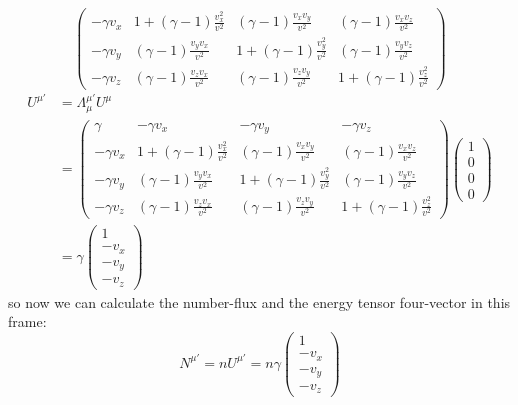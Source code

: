 \documentclass[11pt, a4paper]{report}
\begin{document}
\begin{itemize}
\begin{equation}
\begin{pmatrix}
        -\gamma v_x & 1+(\gamma-1)\frac{v_x^2}{v^2} & (\gamma-1)\frac{v_x v_y}{v^2} & (\gamma-1)\frac{v_x v_z}{v^2} \\
        -\gamma v_y & (\gamma-1)\frac{v_y v_x}{v^2} & 1+(\gamma-1)\frac{v_y^2}{v^2} & (\gamma-1)\frac{v_y v_z}{v^2} \\
        -\gamma v_z & (\gamma-1)\frac{v_z v_x}{v^2} & (\gamma-1)\frac{v_z v_y}{v^2} & 1+(\gamma-1)\frac{v_z^2}{v^2}
        \end{pmatrix}
    \end{equation}
    \begin{align*}
        U^{\mu'} &=\Lambda^{\mu'}_\mu U^\mu \\
        &=
         \begin{pmatrix}
        \gamma & -\gamma v_x & -\gamma v_y & -\gamma v_z \\
        -\gamma v_x & 1+(\gamma-1)\frac{v_x^2}{v^2} & (\gamma-1)\frac{v_x v_y}{v^2} & (\gamma-1)\frac{v_x v_z}{v^2} \\
        -\gamma v_y & (\gamma-1)\frac{v_y v_x}{v^2} & 1+(\gamma-1)\frac{v_y^2}{v^2} & (\gamma-1)\frac{v_y v_z}{v^2} \\
        -\gamma v_z & (\gamma-1)\frac{v_z v_x}{v^2} & (\gamma-1)\frac{v_z v_y}{v^2} & 1+(\gamma-1)\frac{v_z^2}{v^2}
        \end{pmatrix}
        \begin{pmatrix}
            1 \\
            0\\
            0 \\
            0
        \end{pmatrix} \\
        &= \gamma
        \begin{pmatrix}
            1 \\
            -v_x \\
            -v_y \\
            -v_z
        \end{pmatrix}
    \end{align*}
    so now we can calculate the number-flux and the energy tensor four-vector in this frame:
    \begin{equation}
    N^{\mu'} = n U^{\mu'} = n \gamma 
    \begin{pmatrix}
        1 \\
        -v_x \\
        -v_y \\
        -v_z
    \end{pmatrix}

\end{equation}
\end{itemize}
\end{document}
